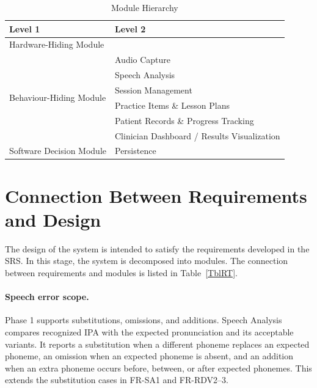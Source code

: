 \documentclass[12pt, titlepage]{article}
\begin{document}
\begin{table}[h!]
\centering
\begin{tabular}{p{} p{}}
\toprule
\textbf{Level 1} & \textbf{Level 2}\\
\midrule

{Hardware-Hiding Module} & ~ \\
\midrule

\multirow{6}{0.3\textwidth}{Behaviour-Hiding Module} & Audio Capture\\
& Speech Analysis\\
& Session Management\\
& Practice Items \& Lesson Plans\\
& Patient Records \& Progress Tracking\\
& Clinician Dashboard / Results Visualization\\
\midrule

{Software Decision Module} & Persistence\\
\bottomrule

\end{tabular}
\caption{Module Hierarchy}
\label{TblMH}
\end{table}

\section{Connection Between Requirements and Design} \label{SecConnection}

The design of the system is intended to satisfy the requirements developed in
the SRS. In this stage, the system is decomposed into modules. The connection
between requirements and modules is listed in Table~\ref{TblRT}.


\paragraph{Speech error scope.}
Phase 1 supports substitutions, omissions, and additions. Speech Analysis
compares recognized IPA with the expected pronunciation and its acceptable
variants. It reports a substitution when a different phoneme replaces an
expected phoneme, an omission when an expected phoneme is absent, and an
addition when an extra phoneme occurs before, between, or after expected
phonemes. This extends the substitution cases in FR-SA1 and FR-RDV2--3.
\end{document}
